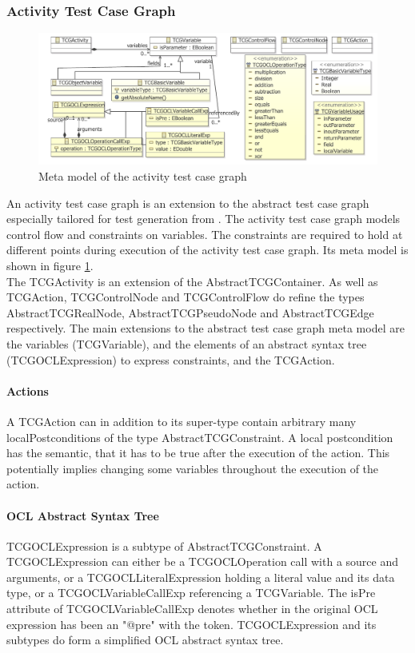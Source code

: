 \subsubsection{Activity Test Case Graph}
\begin{figure}
\label{fig:ActivityTCGMetaModel}
\includegraphics[width=\textwidth]{./pics/ActivityTestCaseGraph.pdf}
\caption{Meta model of the activity test case graph}
\end{figure}
An activity test case graph is an extension to the abstract test case graph especially tailored for test generation from . The activity test case graph models control flow and constraints on variables. The constraints are required to hold at different points during execution of the activity test case graph. Its meta model is shown in figure \ref{fig:ActivityTCGMetaModel}.\\
The TCGActivity is an extension of the AbstractTCGContainer. As well as TCGAction, TCGControlNode and TCGControlFlow do refine the types AbstractTCGRealNode, AbstractTCGPseudoNode and AbstractTCGEdge respectively. 
The main extensions to the abstract test case graph meta model are the variables (TCGVariable), and the elements of an abstract syntax tree (TCGOCLExpression) to express constraints, and the TCGAction.
\paragraph{Actions} A TCGAction can in addition to its super-type contain arbitrary many localPostconditions of the type AbstractTCGConstraint. A local postcondition has the semantic, that it has to be true after the execution of the action. This potentially implies changing some variables throughout the execution of the action.
\paragraph{OCL Abstract Syntax Tree}
TCGOCLExpression is a subtype of AbstractTCGConstraint. A TCGOCLExpression can either be a TCGOCLOperation call with a source and  arguments, or a TCGOCLLiteralExpression holding a literal value and its data type, or a TCGOCLVariableCallExp referencing a TCGVariable. The isPre attribute of TCGOCLVariableCallExp denotes whether in the original OCL expression has been an "@pre" with the token. TCGOCLExpression and its subtypes do form a simplified OCL abstract syntax tree.
